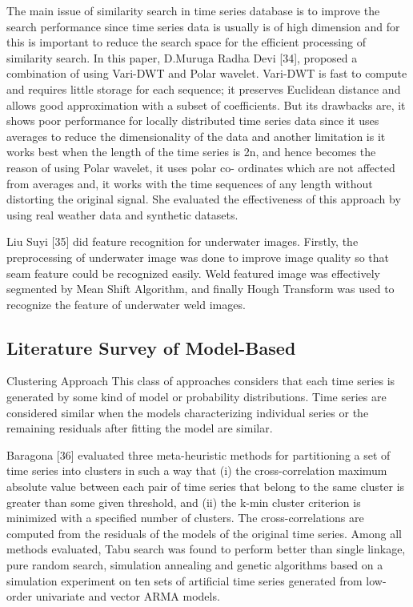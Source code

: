 The main issue of similarity search in time series database is to improve the search performance since time series data is usually  is  of  high  dimension  and  for  this  is  important  to reduce the search space for the efficient processing of similarity search. In this paper, D.Muruga Radha Devi [34], proposed  a  combination  of  using  Vari-DWT  and  Polar wavelet. Vari-DWT is fast to compute and requires little storage for each sequence; it preserves Euclidean distance and allows good approximation with a subset of coefficients. But its drawbacks are, it shows poor performance for locally distributed time series data since it uses averages to reduce the dimensionality of the data and another limitation is it works
best when the length of the time series is 2n, and hence becomes the reason of using Polar wavelet, it uses polar co-
ordinates which are not affected from averages and, it works with the time sequences of any length without distorting the original   signal.   She   evaluated   the   effectiveness   of  this approach by using real weather data and synthetic datasets.

Liu Suyi [35] did feature recognition for underwater images. Firstly, the preprocessing of underwater image was done to improve image quality so that seam feature could be recognized easily. Weld featured image was effectively segmented by Mean Shift Algorithm, and finally Hough Transform was used to recognize the feature of underwater weld images.

\subsection{Literature Survey of Model-Based}
Clustering Approach
This class of approaches considers that each time series is
generated by some kind of model or probability distributions. Time series are considered similar when the models characterizing  individual  series  or  the  remaining  residuals after fitting the model are similar.

Baragona [36] evaluated three meta-heuristic methods for partitioning a set of time series into clusters in such a way that (i)  the  cross-correlation  maximum  absolute  value  between each pair of time series that belong to the same cluster is greater than some given threshold, and (ii) the k-min cluster criterion is minimized with a specified number of clusters. The cross-correlations are computed from the residuals of the models of the original time series. Among all methods evaluated,  Tabu  search  was  found  to  perform  better  than single linkage, pure random search, simulation annealing and genetic algorithms based on a simulation experiment on ten sets of artificial time series generated from low-order univariate and vector ARMA models.

